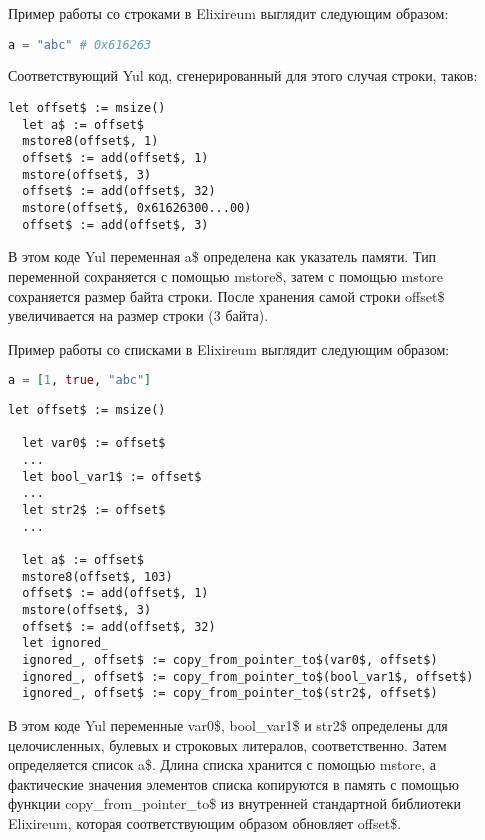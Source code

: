 Пример работы со строками в Elixireum выглядит следующим образом:

\begin{lstlisting}[caption={Код Elixireum для регистра строк}, language=elixir]
  a = "abc" # 0x616263
\end{lstlisting}
  
Соответствующий Yul код, сгенерированный для этого случая строки, таков:

\begin{lstlisting}[caption={Сгенерированный Yul-код для случая строки}, language=yul]
  let offset$ := msize() 
  let a$ := offset$ 
  mstore8(offset$, 1)
  offset$ := add(offset$, 1)
  mstore(offset$, 3)
  offset$ := add(offset$, 32) 
  mstore(offset$, 0x61626300...00)
  offset$ := add(offset$, 3) 
\end{lstlisting}

В этом коде Yul переменная a\$ определена как указатель памяти. Тип переменной сохраняется с помощью mstore8, затем с помощью mstore сохраняется размер байта строки. После хранения самой строки offset\$ увеличивается на размер строки (3 байта).

Пример работы со списками в Elixireum выглядит следующим образом:

\begin{lstlisting}[caption={Код Elixireum для случая списка}, language=elixir]
  a = [1, true, "abc"]
\end{lstlisting}
  
\begin{lstlisting}[caption={Сгенерированный yul-код для случая строки}, language=yul]
  let offset$ := msize()
  
  let var0$ := offset$
  ...  
  let bool_var1$ := offset$
  ...
  let str2$ := offset$
  ...
  
  let a$ := offset$ 
  mstore8(offset$, 103) 
  offset$ := add(offset$, 1)
  mstore(offset$, 3) 
  offset$ := add(offset$, 32) 
  let ignored_
  ignored_, offset$ := copy_from_pointer_to$(var0$, offset$) 
  ignored_, offset$ := copy_from_pointer_to$(bool_var1$, offset$) 
  ignored_, offset$ := copy_from_pointer_to$(str2$, offset$) 
\end{lstlisting}

В этом коде Yul переменные var0\$, bool\_var1\$ и str2\$ определены для целочисленных, булевых и строковых литералов, соответственно. Затем определяется список a\$. Длина списка хранится с помощью mstore, а фактические значения элементов списка копируются в память с помощью функции copy\_from\_pointer\_to\$ из внутренней стандартной библиотеки Elixireum, которая соответствующим образом обновляет offset\$.